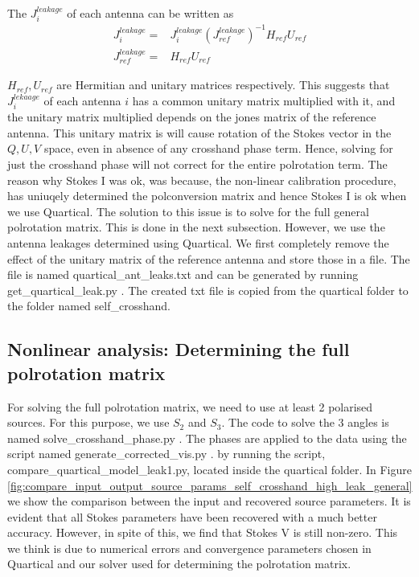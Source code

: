 \documentclass{article}
\begin{document}
The $J^{leakage}_{i}$ of each antenna can be written as
\begin{align}
J^{leakage}_i=& J^{leakage}_i \left ( J^{leakage}_{ref} \right )^{-1} H_{ref}U_{ref}\\
J^{leakage}_{ref}=& H_{ref}U_{ref}
\end{align}

$H_{ref},U_{ref}$ are Hermitian and unitary matrices respectively. This suggests that $J^{lekaage}_i$ of each antenna $i$ has a common unitary matrix multiplied with it, and the unitary matrix multiplied depends on the jones matrix of the reference antenna. This unitary matrix is will cause rotation of the Stokes vector in the $Q,U, V$  space, even in absence of any crosshand phase term. Hence, solving for just the crosshand phase will not correct for the entire polrotation term. The reason why Stokes I was ok, was because, the non-linear calibration procedure, has uniuqely determined the polconversion matrix and hence Stokes I is ok when we use Quartical. The solution to this issue is to solve for the full general polrotation matrix. This is done in the next subsection. However, we use the antenna leakages determined using Quartical. We first completely remove the effect of the unitary matrix of the reference antenna and store those in a file. The file is named quartical\_ant\_leaks.txt and can be generated by running get\_quartical\_leak.py . The created txt file is copied from the quartical folder to the folder named self\_crosshand.


\subsection{Nonlinear analysis: Determining the full polrotation matrix} \label{sec:full_porot}

For solving the full polrotation matrix, we need to use at least 2 polarised sources. For this purpose, we use $S_2$ and $S_3$. The code to solve the 3 angles is named solve\_crosshand\_phase.py . The phases are applied to the data using the script named generate\_corrected\_vis.py .  by running the script, compare\_quartical\_model\_leak1.py, located inside the quartical folder. In Figure \ref{fig:compare_input_output_source_params_self_crosshand_high_leak_general} we show the comparison between the input and recovered source parameters. It is evident that all Stokes parameters have been recovered with a much better accuracy. However, in spite of this, we find that Stokes V is still non-zero. This we think is due to numerical errors and convergence parameters chosen in Quartical and our solver used for determining the polrotation matrix.
\end{document}
